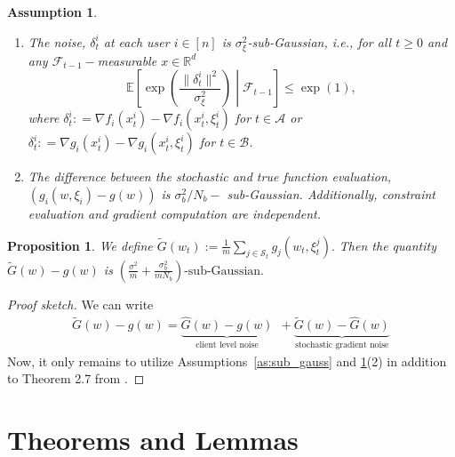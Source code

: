 \documentclass{article} %
\newtheorem{proposition}{Proposition}[]
\newtheorem{assumption}[]{Assumption}
\def\A{{\mathcal A}}
\def\B{{\mathcal B}}
\begin{document}
\begin{assumption}
    \label{as:sgd_noise_bound}
    \begin{enumerate}
        \item The noise, $\delta_t^i$ at each user $i \in [n]$ is $\sigma_\xi^2$-sub-Gaussian, i.e., for all $t \ge 0$ and any $\mathcal{F}_{t-1}-$measurable $x \in \mathbb{R}^d$
        \[
        \mathbb{E} \left[ \exp \left( \frac{\|\delta_t^i\|^2}{\sigma_\xi^2} \right) \middle| \mathcal{F}_{t-1} \right] \le \exp(1),
        \]
        where $\delta_t^i : = \nabla f_i(x_t^i) - \nabla f_i(x_t^i,\xi_t^i)$ for $t \in \A$ or $\delta_t^i : = \nabla g_i(x_t^i) - \nabla g_i(x_t^i,\xi_t^i)$ for $t \in \B$.
        \item The difference between the stochastic and true function evaluation, $(g_i(w,\xi_i) - g(w))$ is $\sigma_b^2/N_b-$ sub-Gaussian. Additionally, constraint evaluation and gradient computation are independent.
    \end{enumerate}
\end{assumption}
\begin{proposition}
    \label{prop:Total_subGauss_stoch}
    We define $\tilde{G}(w_t) := \frac{1}{m}\sum_{j \in \mathcal S_t} g_j(w_t, \xi_t^j).$ Then the quantity $\tilde{G}(w) - g(w)$ is $ \left(\frac{\sigma^2}{m} + \frac{\sigma_b^2}{mN_b}\right)\text{-sub-Gaussian}.$
\end{proposition}
\begin{proof}[Proof sketch]
    We can write 
    \begin{align*}
        \tilde{G}(w) - g(w) = \underbrace{\hat{G}(w) - g(w)}_{\text{client level noise}} \ \ + \underbrace{\tilde{G}(w) - \hat{G}(w)}_{\text{stochastic gradient noise}}
    \end{align*}
    Now, it only remains to utilize Assumptions~\ref{as:sub_gauss} and \ref{as:sgd_noise_bound}(2) in addition to Theorem 2.7 from \cite{rivasplata2012subgaussian}.
\end{proof}
\section{Theorems and Lemmas}
\label{sec:proofs_thms}
\end{document}
